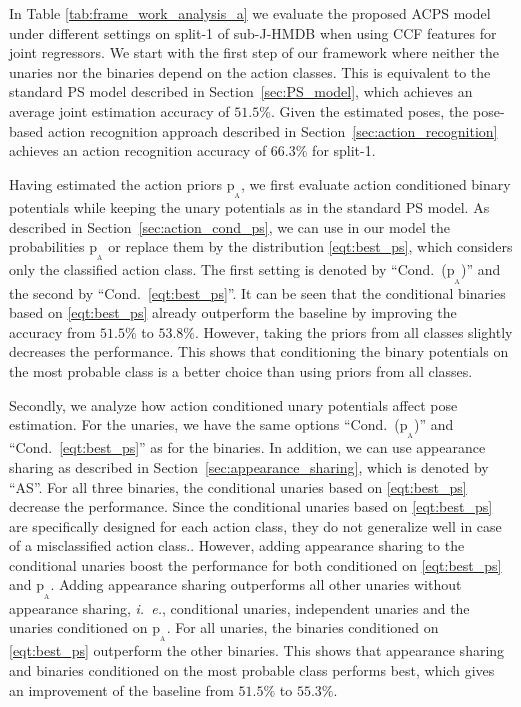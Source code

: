 \documentclass[a4paper, 10pt, conference]{ieeeconf}      \usepackage{FG2017}
\newcommand{\ie}{\mbox{\emph{i. e.}}}
\begin{document}
In Table \ref{tab:frame_work_analysis_a} we evaluate the proposed ACPS model under different settings on split-1 of sub-J-HMDB when using CCF features for joint regressors. We start with the first step of our framework where neither the unaries nor the binaries depend on the action classes. This is equivalent to the standard PS model described in Section~\ref{sec:PS_model}, which achieves an average joint estimation accuracy of $51.5\%$. Given the estimated poses, the pose-based action recognition approach described in Section~\ref{sec:action_recognition} achieves an action recognition accuracy of $66.3\%$ for split-1.  


Having estimated the action priors $\mathrm{p_{_A}}$, we first evaluate action conditioned binary potentials while keeping the unary potentials as in the standard PS model. As described in Section~\ref{sec:action_cond_ps}, we can use in our model the probabilities $\mathrm{p_{_A}}$ or replace them by the distribution \eqref{eqt:best_ps}, which considers only the classified action class. The first setting is denoted by ``Cond.\ ($\mathrm{p_{_A}}$)'' and the second by ``Cond.\ \eqref{eqt:best_ps}''. It can be seen that the conditional binaries based on \eqref{eqt:best_ps} already outperform the baseline by improving the accuracy from $51.5\%$ to $53.8\%$. However, taking the priors from all classes slightly decreases the performance. This shows that conditioning the binary potentials on the most probable class is a better choice than using priors from all classes. 

Secondly, we analyze how action conditioned unary potentials affect pose estimation. For the unaries, we have the same options ``Cond.\ ($\mathrm{p_{_A}}$)'' and ``Cond.\ \eqref{eqt:best_ps}'' as for the binaries. In addition, we can use appearance sharing as described in Section~\ref{sec:appearance_sharing}, which is denoted by ``AS''. For all three binaries, the conditional unaries based on \eqref{eqt:best_ps} decrease the performance.
Since the conditional unaries based on \eqref{eqt:best_ps} are specifically designed for each action class, they do not generalize well in case of a misclassified action class.. 
However, adding appearance sharing to the conditional unaries boost the performance for both conditioned on \eqref{eqt:best_ps} and $\mathrm{p_{_A}}$. Adding appearance sharing outperforms  all other unaries without appearance sharing, \ie, conditional unaries, independent unaries and the unaries conditioned on $\mathrm{p_{_A}}$. For all unaries, the binaries conditioned on \eqref{eqt:best_ps} outperform the other binaries.    
This shows that appearance sharing and binaries conditioned on the most probable class performs best, which gives an improvement of the baseline from $51.5\%$ to $55.3\%$. 
\end{document}
